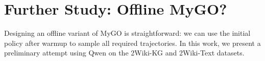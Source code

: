 





\section{Further Study: Offline MyGO?}
\label{appendix_offline}
Designing an offline variant of MyGO is straightforward: we can use the initial policy after warmup to sample all required trajectories. In this work, we present a preliminary attempt using Qwen on the 2Wiki-KG and 2Wiki-Text datasets.

